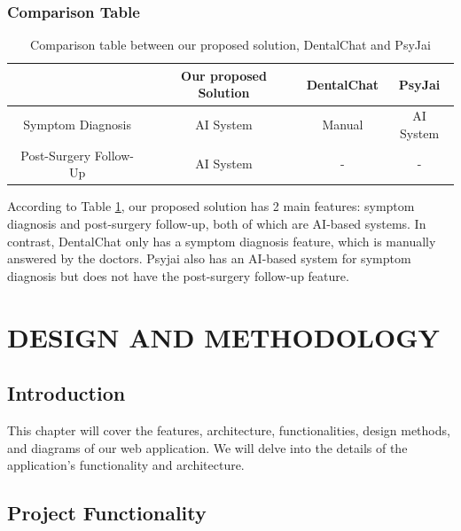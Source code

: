 \documentclass[12pt,oneside,openright,a4paper]{cpe-english-project}
\begin{document}
      \subsection{Comparison Table}
        \begin{table}[h]
          \centering
          \caption{\centering Comparison table between our proposed solution, DentalChat and PsyJai}\label{tab:Comparison_Table}
          \begin{tabular}{|c|c|c|c|} \hline
            & Our proposed Solution & DentalChat & PsyJai \\\hline
            Symptom Diagnosis & AI System & Manual & AI System \\\hline
            Post-Surgery Follow-Up & AI System & - & - \\\hline
          \end{tabular}
        \end{table}
        \qquad According to Table \ref{tab:Comparison_Table}, our proposed solution has 2 main features: symptom diagnosis and post-surgery follow-up, both of which are AI-based systems. In contrast, DentalChat only has a symptom diagnosis feature, which is manually answered by the doctors. Psyjai also has an AI-based system for symptom diagnosis but does not have the post-surgery follow-up feature.\par

\chapter{DESIGN AND METHODOLOGY}
  \section{Introduction}
  \qquad This chapter will cover the features, architecture, functionalities, design methods, and diagrams of our web application. We will delve into the details of the application’s functionality and architecture. \par
  \section{Project Functionality}
\end{document}
